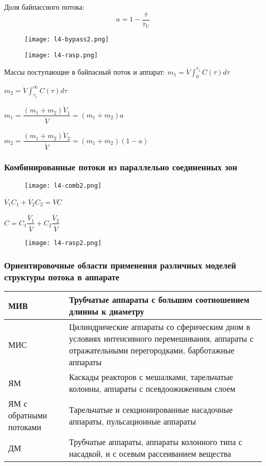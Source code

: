 \begin{frame}
Доля байпассного потока:
\begin{equation}
	a=1- \dfrac { \bar \tau } { \bar \tau_U }
\end{equation}
	\begin{figure}[h]
		\texttt{[image: l4-bypass2.png]}
	\end{figure}
	\begin{figure}[h]
		\texttt{[image: l4-rasp.png]}
	\end{figure}
\end{frame}

\begin{frame}
	Массы поступающие в байпасный поток и аппарат:
	$m_1= \dot{V} \int_0^{\tau_1} C( \tau ) d\tau$
	
	
	$m_2=\dot{V} \int_{\tau_1}^{\infty} C( \tau ) d\tau$
	
	
	$m_1=\dfrac { (m_1+m_2) \dot V_1 } { \dot{V}} = (m_1+m_2) a$
	
	$m_2=\dfrac { (m_1+m_2) \dot V_2 } {\dot{V}} =(m_1+m_2)( 1-a )$
\end{frame}

\begin{frame}
	\frametitle{Комбинированные потоки из параллельно соединенных зон }
	\begin{figure}[h]
		\texttt{[image: l4-comb2.png]}
	\end{figure}
	
	$\dot {V_1} C_1 + \dot {V_2} C_2 = \dot{V} C$
	
	$C=C_1 \dfrac { \dot{ V_1} } { \dot{V} } + C_2 \dfrac{ \dot {V_2} } { \dot{V} }$
\end{frame}


\begin{frame}
	
	\begin{figure}[h]
		\texttt{[image: l4-rasp2.png]}
	\end{figure}
	
\end{frame}

\begin{frame}
	\frametitle{Ориентировочные области применения различных моделей структуры потока в аппарате}
	
	\begin{tabular}{| p{2cm} | p{8cm} | }
		\hline
		МИВ & Трубчатые аппараты с большим соотношением длинны к диаметру  \\ \hline
		МИС & Цилиндрические аппараты со сферическим дном в условиях интенсивного перемешивания, аппараты с отражательными перегородками, барботажные аппараты   \\ \hline
		ЯМ & Каскады реакторов с мешалками, тарельчатые колонны, аппараты с псевдоожиженным слоем  \\ \hline
		ЯМ с обратными потоками & Тарельчатые и секционированные насадочные аппараты, пульсационные аппараты \\ \hline
		ДМ & Трубчатые аппараты, аппараты колонного типа с насадкой, и с осевым рассеиванием вещества \\ \hline
	\end{tabular}
\end{frame}